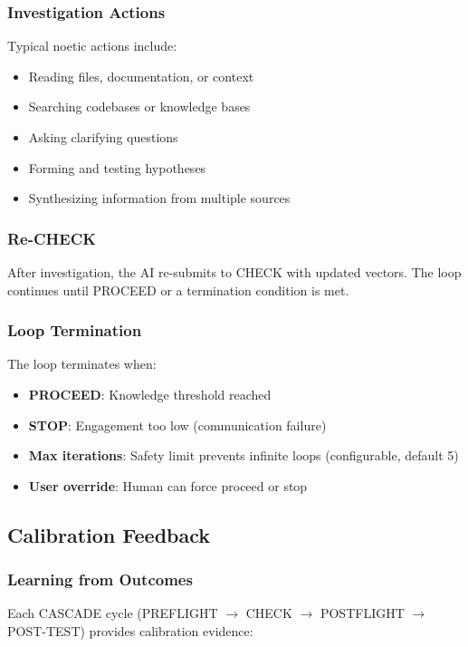\subsubsection{Investigation Actions}

Typical noetic actions include:
\begin{itemize}
    \item Reading files, documentation, or context
    \item Searching codebases or knowledge bases
    \item Asking clarifying questions
    \item Forming and testing hypotheses
    \item Synthesizing information from multiple sources
\end{itemize}

\subsubsection{Re-CHECK}

After investigation, the AI re-submits to CHECK with updated vectors. The loop continues until PROCEED or a termination condition is met.

\subsubsection{Loop Termination}

The loop terminates when:
\begin{itemize}
    \item \textbf{PROCEED}: Knowledge threshold reached
    \item \textbf{STOP}: Engagement too low (communication failure)
    \item \textbf{Max iterations}: Safety limit prevents infinite loops (configurable, default 5)
    \item \textbf{User override}: Human can force proceed or stop
\end{itemize}

\subsection{Calibration Feedback}

\subsubsection{Learning from Outcomes}

Each CASCADE cycle (PREFLIGHT $\rightarrow$ CHECK $\rightarrow$ POSTFLIGHT $\rightarrow$ POST-TEST) provides calibration evidence:

